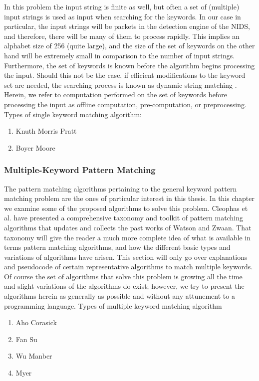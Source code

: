 \documentclass[12pt,a4paper]{report}
\begin{document}
In this problem the input string is finite as well, but often a set of (multiple) input strings    is
used as input when searching for the keywords. In our case in particular, the input
strings will be packets in the detection engine of the NIDS, and therefore, there will
be many of them to process rapidly. This implies an alphabet size of 256 (quite
large), and the size of the set of keywords on the other hand will be extremely small
in comparison to the number of input strings. Furthermore, the set of keywords is
known before the algorithm begins processing the input. Should this not be the case,
if efficient modifications to the keyword set are needed, the searching process is known
as dynamic string matching .
Herein, we refer to computation performed on the set of keywords before processing
the input as offline computation, pre-computation, or preprocessing. 
Types of single keyword matching algorithm:
\begin{enumerate}
\item Knuth Morris Pratt
\item Boyer Moore
\end{enumerate}
\subsubsection{Multiple-Keyword Pattern Matching}
The pattern matching algorithms pertaining to the general keyword pattern matching
problem are the ones of particular interest in this thesis. In this chapter we examine
some of the proposed algorithms to solve this problem. Cleophas et al. have
presented a comprehensive taxonomy and toolkit of pattern matching algorithms that
updates and collects the past works of Watson and Zwaan. That taxonomy
will give the reader a much more complete idea of what is available in terms pattern
matching algorithms, and how the different basic types and variations of algorithms
have arisen. This section will only go over explanations and pseudocode of certain
representative algorithms to match multiple keywords. Of course the set of algorithms
that solve this problem is growing all the time and slight variations of the algorithms
do exist; however, we try to present the algorithms herein as generally as possible
and without any attunement to a programming language.
Types of multiple keyword matching algorithm
\begin{enumerate}
\item Aho Corasick
\item Fan Su
\item Wu Manber
\item Myer
\end{enumerate}
\end{document}
